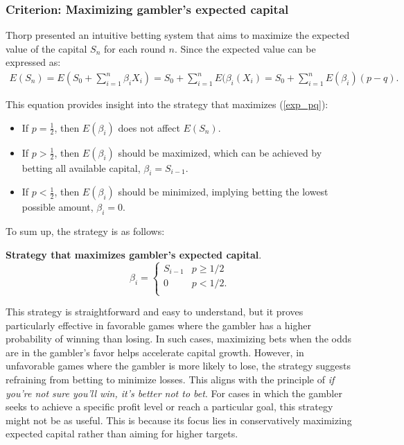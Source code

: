 \documentclass[11pt,twoside]{article}
\numberwithin{Theorem}{section}
\numberwithin{Definition}{section}
\numberwithin{Lemma}{section}
\numberwithin{Algorithm}{section}
\numberwithin{equation}{section}
\begin{document}
\subsubsection{Criterion: Maximizing gambler's expected capital}
Thorp\cite{Thorp} presented an intuitive betting system that aims to maximize the expected value of the capital $S_{n}$ for each round $n$. Since the expected value can be expressed as:
\begin{eqnarray}\label{exp_pq}
E(S_{n}) = E(S_{0} + \sum_{i=1}^{n}\beta_{i}X_{i})=S_{0} + \sum_{i=1}^{n}E(\beta_{i}(X_{i})=S_{0} + \sum_{i=1}^{n}E(\beta_{i})(p-q).
\end{eqnarray}

This equation provides insight into the strategy that maximizes (\ref{exp_pq}):
\begin{itemize}
    \item If $p = \frac{1}{2}$, then $E(\beta_{i})$ does not affect $E(S_{n})$.
    \item If $p > \frac{1}{2}$, then $E(\beta_{i})$ should be maximized, which can be achieved by betting all available capital, $\beta_{i} = S_{i-1}$.
    \item If $p < \frac{1}{2}$, then $E(\beta_{i})$ should be minimized, implying betting the lowest possible amount, $\beta_{i} = 0$.
\end{itemize}

To sum up, the strategy is as follows:

\begin{tcolorbox}[colback=gray!10,boxrule=0.25pt]
\textbf{Strategy that maximizes gambler's expected capital}. \\
\begin{equation*}\label{strategy_1}
\beta_{i} = \left\{
\begin{array}{ll}
S_{i-1}&  p \geq 1/2\\
0 &  p< 1/2.\\
\end{array}
\right.
\end{equation*}
\end{tcolorbox}

This strategy is straightforward and easy to understand, but it proves particularly effective in favorable games where the gambler has a higher probability of winning than losing. In such cases, maximizing bets when the odds are in the gambler's favor helps accelerate capital growth. However, in unfavorable games where the gambler is more likely to lose, the strategy suggests refraining from betting to minimize losses. This aligns with the principle of \textit{if you're not sure you'll win, it's better not to bet}. For cases in which the gambler seeks to achieve a specific profit level or reach a particular goal, this strategy might not be as useful. This is because its focus lies in conservatively maximizing expected capital rather than aiming for higher targets.
\end{document}
